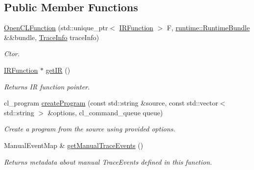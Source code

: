 \subsection*{Public Member Functions}
\begin{DoxyCompactItemize}
\item 
\mbox{\label{classglow_1_1_open_c_l_function_acceb2df182fbdbc61d07191c02cc2429}} 
\hyperlink{classglow_1_1_open_c_l_function_acceb2df182fbdbc61d07191c02cc2429}{Open\+C\+L\+Function} (std\+::unique\+\_\+ptr$<$ \hyperlink{classglow_1_1_i_r_function}{I\+R\+Function} $>$ F, \hyperlink{classglow_1_1runtime_1_1_runtime_bundle}{runtime\+::\+Runtime\+Bundle} \&\&bundle, \hyperlink{structglow_1_1_trace_info}{Trace\+Info} trace\+Info)
\begin{DoxyCompactList}\small\item\em Ctor. \end{DoxyCompactList}\item 
\mbox{\label{classglow_1_1_open_c_l_function_a0ecb51b615dffb23c038c8f4f36da5d2}} 
\hyperlink{classglow_1_1_i_r_function}{I\+R\+Function} $\ast$ \hyperlink{classglow_1_1_open_c_l_function_a0ecb51b615dffb23c038c8f4f36da5d2}{get\+IR} ()
\begin{DoxyCompactList}\small\item\em Returns IR function pointer. \end{DoxyCompactList}\item 
\mbox{\label{classglow_1_1_open_c_l_function_a6e7b507f5f900a686c9b3ecfd93577fc}} 
cl\+\_\+program \hyperlink{classglow_1_1_open_c_l_function_a6e7b507f5f900a686c9b3ecfd93577fc}{create\+Program} (const std\+::string \&source, const std\+::vector$<$ std\+::string $>$ \&options, cl\+\_\+command\+\_\+queue queue)
\begin{DoxyCompactList}\small\item\em Create a program from the {\ttfamily source} using provided {\ttfamily options}. \end{DoxyCompactList}\item 
\mbox{\label{classglow_1_1_open_c_l_function_aa96272cbfb8bd4fffabc03a8f50207ee}} 
Manual\+Event\+Map \& \hyperlink{classglow_1_1_open_c_l_function_aa96272cbfb8bd4fffabc03a8f50207ee}{get\+Manual\+Trace\+Events} ()
\begin{DoxyCompactList}\small\item\em Returns metadata about manual Trace\+Events defined in this function. \end{DoxyCompactList}\end{DoxyCompactItemize}

